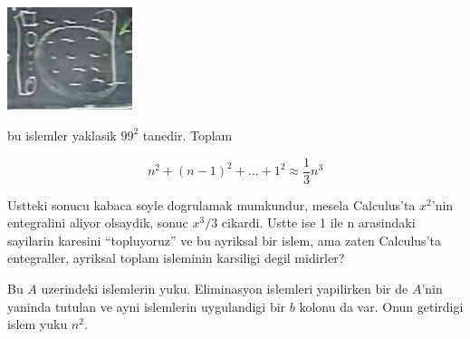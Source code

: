 \documentclass[12pt,fleqn]{article}\usepackage{../common}
\begin{document}
\includegraphics[height=3cm]{02.png}

bu islemler yaklasik $99^2$ tanedir. Toplam

\[ n^2 + (n-1)^2 + ... + 1^2 \approx \frac{ 1}{3} n^3 \]

Ustteki sonucu kabaca soyle dogrulamak mumkundur, mesela Calculus'ta
$x^2$'nin entegralini aliyor olsaydik, sonuc $x^3/3$
cikardi. Ustte ise 1 ile n arasindaki sayilarin karesini ``topluyoruz'' ve
bu ayriksal bir islem, ama zaten Calculus'ta entegraller, ayriksal toplam
isleminin karsiligi degil midirler? 

Bu $A$ uzerindeki islemlerin yuku. Eliminasyon islemleri yapilirken bir de
$A$'nin yaninda tutulan ve ayni islemlerin uygulandigi bir $b$ kolonu da
var. Onun getirdigi islem yuku $n^2$. 
\end{document}
